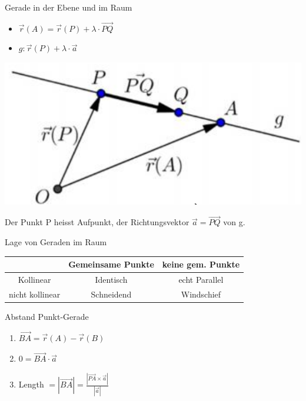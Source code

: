 \begin{definition}{Gerade}
    in der Ebene und im Raum\\
    \begin{minipage}{0.65\linewidth}
        \begin{itemize}
            \item $\overrightarrow{r}(A) = \overrightarrow{r}(P) + \lambda \cdot \overrightarrow{PQ}$
            \item $g: \overrightarrow{r}(P) + \lambda \cdot \overrightarrow{a}$
        \end{itemize}
    \end{minipage}
    \begin{minipage}{0.3\linewidth}
        \includegraphics[width=0.9\linewidth]{gerade.png}
    \end{minipage}
    Der Punkt P heisst Aufpunkt, der Richtungsvektor $\overrightarrow{a}  = \overrightarrow{PQ}$ von g.
\end{definition}

\begin{theorem}{Lage} von Geraden im Raum\\
    \vspace*{2mm}
    \begin{tabular}{c|c|c|}
        & Gemeinsame Punkte & keine gem. Punkte \\
        \hline
        Kollinear & Identisch & echt Parallel \\
        \hline
        nicht kollinear & Schneidend & Windschief \\
        \hline
    \end{tabular}
\end{theorem}

\begin{KR}{Abstand Punkt-Gerade}
    \begin{enumerate}
        \item $\overrightarrow{BA} = \overrightarrow{r}(A) - \overrightarrow{r}(B)$
        \item $0 = \overrightarrow{BA} \cdot \overrightarrow{a}$
        \item Length $= |\overrightarrow{BA}| = \frac{|\overrightarrow{PA} \times \overrightarrow{a}|}{|\overrightarrow{a}|}$
    \end{enumerate}
\end{KR}

